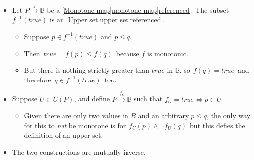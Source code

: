 \begin{itemize}
    \item  Let $P \xrightarrow{f} \mathbb{B}$ be a \ref{Monotone map|monotone map|referenced}. The subset $f^{-1}(true)$ is an \ref{Upper set|upper set|referenced}. \begin{itemize}
            \item Suppose $p \in f^{-1}(true)$ and $p \leq q$.
            \item Then \,$true = f(p) \leq f(q)$\, because $f$ is monotonic.
            \item But there is nothing strictly greater than $true$ in $\mathbb{B}$, so \,$f(q) = true$\, and therefore \,$q \in f^{-1}(true)$\, too.
          \end{itemize}
    \item Suppose $U \in U(P)$, and define $P\xrightarrow{f_U}\mathbb{B}$ such that $f_U=true \iff p \in U$
          \begin{itemize}
            \item Given there are only two values in $B$ and an arbitrary $p\leq q$, the only way for this to \emph{not} be monotone is for \,$f_U(p) \land \neg f_U(q)$\, but this defies the definition of an upper set.
          \end{itemize}
    \item The two constructions are mutually inverse.

  \end{itemize}